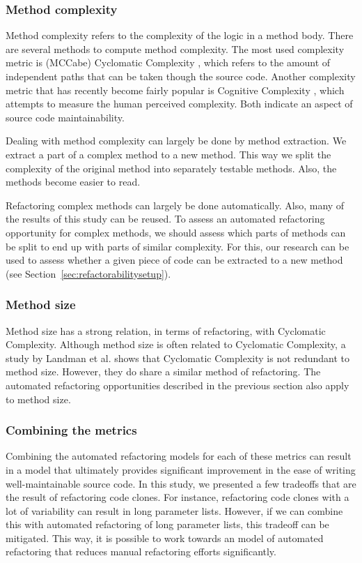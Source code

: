 \subsubsection{Method complexity}
Method complexity refers to the complexity of the logic in a method body. There are several methods to compute method complexity. The most used complexity metric is (MCCabe) Cyclomatic Complexity \cite{visser2016building}, which refers to the amount of independent paths that can be taken though the source code. Another complexity metric that has recently become fairly popular is Cognitive Complexity \cite{campbell2017cognitive}, which attempts to measure the human perceived complexity. Both indicate an aspect of source code maintainability.

Dealing with method complexity can largely be done by method extraction. We extract a part of a complex method to a new method. This way we split the complexity of the original method into separately testable methods. Also, the methods become easier to read.

Refactoring complex methods can largely be done automatically. Also, many of the results of this study can be reused. To assess an automated refactoring opportunity for complex methods, we should assess which parts of methods can be split to end up with parts of similar complexity. For this, our research can be used to assess whether a given piece of code can be extracted to a new method (see Section~\ref{sec:refactorabilitysetup}).

\subsubsection{Method size}
Method size has a strong relation, in terms of refactoring, with Cyclomatic Complexity. Although method size is often related to Cyclomatic Complexity, a study by Landman et al. \cite{landman2016empirical} shows that Cyclomatic Complexity is not redundant to method size. However, they do share a similar method of refactoring. The automated refactoring opportunities described in the previous section also apply to method size.

\subsubsection{Combining the metrics}
Combining the automated refactoring models for each of these metrics can result in a model that ultimately provides significant improvement in the ease of writing well-maintainable source code. In this study, we presented a few tradeoffs that are the result of refactoring code clones. For instance, refactoring code clones with a lot of variability can result in long parameter lists. However, if we can combine this with automated refactoring of long parameter lists, this tradeoff can be mitigated. This way, it is possible to work towards an model of automated refactoring that reduces manual refactoring efforts significantly.

